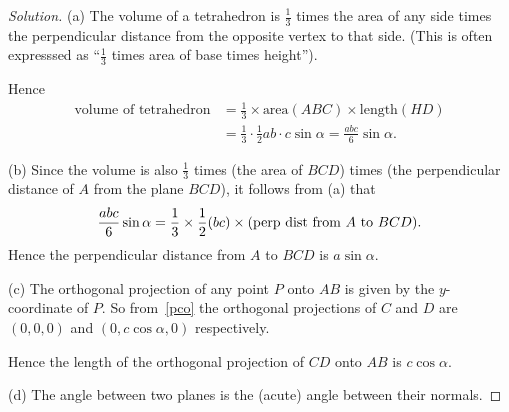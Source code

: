 \documentclass[11pt,a4paper]{report}
\theoremstyle{plain}
\theoremstyle{definition}
\begin{document}
\begin{proof}[Solution]
\bigskip 
(a) The volume of a tetrahedron is $ \frac{1}{3} $  times the area of any side times the perpendicular distance from the opposite vertex to that side. (This is often expresssed as ``$ \frac{1}{3}$  times area of base times height'').  

Hence
\begin{align*}
{  \text{volume of tetrahedron}} & =  \frac{1}{3} \times \text{area}(ABC) \times \text{length} (HD) \\
		&= \frac{1}{3} \cdot \frac{1}{2}ab \cdot c \sin \alpha {  = \frac{abc}{6}  \sin \alpha} .
\end{align*}  

\bigskip 
(b) Since the volume is also $ \frac{1}{3} $ times (the area of $ BCD$)  times (the perpendicular distance of $ A $ from the plane  $ BCD $), it follows from (a) that 
\[
\frac{abc}{6}  \sin \alpha = \frac{1}{3} \times \frac{1}{2} (bc) \times \text{(perp  dist from $ A $ to $ BCD $)}.
\]
Hence the {  perpendicular  distance from $ A $ to $ BCD $ is $ a \sin \alpha $}.

\bigskip 
(c) The orthogonal projection of any point $ P $ onto $ AB $ is given by the $ y $-coordinate of $ P $.  So from~\eqref{pco} the orthogonal projections of $ C $ and $ D $ are $ (0,0,0) $  and $ (0, c\cos \alpha , 0 ) $ respectively.

Hence the {  length of the orthogonal projection of $ CD $ onto $ AB $ is $ c \cos \alpha $}.

\bigskip 
(d) The angle between two planes is the (acute) angle between their normals.  


\end{proof}
\end{document}
